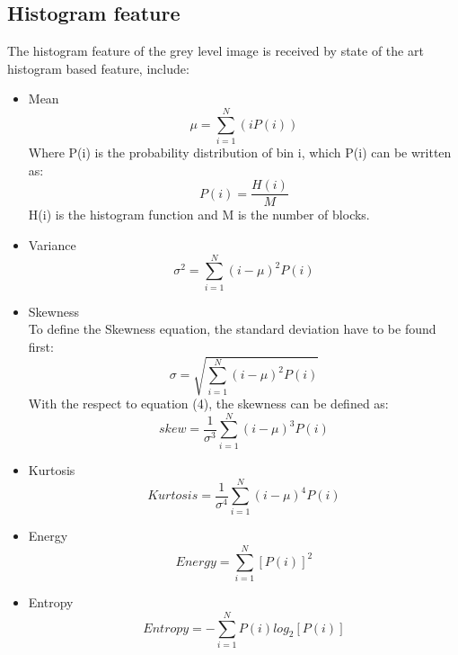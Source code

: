 \documentclass[review]{elsarticle}
\begin{document}
\subsection{Histogram feature}
\label{subsec:histogram}
The histogram feature of the grey level image is received by state of the art histogram based feature, include:

\begin{itemize}
	\item Mean
	\begin{equation}
	\mu= \sum_{i=1}^N (iP(i))
	\end{equation}
	Where	P(i) is the probability distribution of bin i, which P(i) can be written as: 
	\begin{equation}
	P(i) =\dfrac{H(i)}{M}
	\end{equation}
	\hspace{1cm}H(i) is the histogram function and M is the number of blocks.
	
	
	\item Variance
	\begin{equation}
	\sigma^2= \sum_{i=1}^N (i - \mu)^2P(i)
	\end{equation}
	
	
	\item Skewness \\
	To define the Skewness equation, the standard deviation have to be found first: 
	\begin{equation}
	\sigma = \sqrt{ \sum_{i=1}^N (i - \mu)^2 P(i)}
	\end{equation}
	With the respect to equation (4), the skewness can be defined as: 
	\begin{equation}
	skew = \dfrac{1}{\sigma^3} \sum_{i=1}^N (i - \mu)^3 P(i)
	\end{equation}
	
	\item Kurtosis 
	\begin{equation}
	Kurtosis = \dfrac{1}{\sigma^4} \sum_{i=1}^N (i - \mu)^4 P(i)
	\end{equation}
	
	\item Energy 
	\begin{equation}
	Energy= \sum_{i=1}^N [P(i)]^2
	\end{equation}
	
	
	\item Entropy 
	\begin{equation}
	Entropy= - \sum_{i=1}^N P(i) log_2 [P(i)]
	\end{equation}
\end{itemize}
\end{document}
